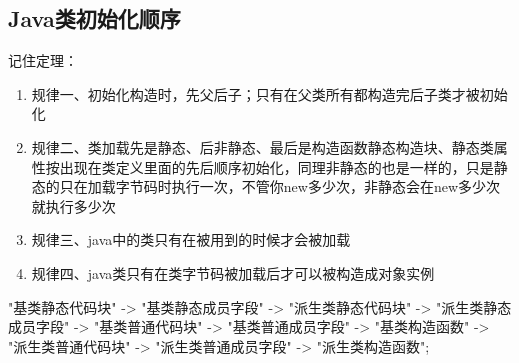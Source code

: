 \documentclass[../../../interview-questions.tex]{subfiles}
\begin{document}
\subsection{Java类初始化顺序}

记住定理：

\begin{enumerate}
\item{规律一、初始化构造时，先父后子；只有在父类所有都构造完后子类才被初始化}
\item{规律二、类加载先是静态、后非静态、最后是构造函数}静态构造块、静态类属性按出现在类定义里面的先后顺序初始化，同理非静态的也是一样的，只是静态的只在加载字节码时执行一次，不管你new多少次，非静态会在new多少次就执行多少次
\item{规律三、java中的类只有在被用到的时候才会被加载}
\item{规律四、java类只有在类字节码被加载后才可以被构造成对象实例}
\end{enumerate}


"基类静态代码块" -> "基类静态成员字段" -> "派生类静态代码块"
    -> "派生类静态成员字段" -> "基类普通代码块" -> "基类普通成员字段"
    -> "基类构造函数" -> "派生类普通代码块"
    -> "派生类普通成员字段" -> "派生类构造函数";
    
\end{document}
